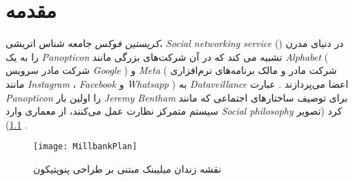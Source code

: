 
\chapter{مقدمه}
\ifDataveillance
  \textit{کریستین فوکس}
  جامعه شناس اتریشی،
  \textit{
    \gls{Social networking service}
  }
  \!({})
  در دنیای مدرن را به یک
  \textit{
    \gls{Panopticon}
  }
  تشبیه می کند   که در آن شرکت‌های بزرگی مانند
  \textit{
    \gls{Alphabet}
  }
  \!(
  شرکت مادر سرویس
  \textit{
    \gls{Google}
  }
  \!)
  و
  \textit{
    \gls{Meta}
  }
  \!(
  \!شرکت مادر و مالک برنامه‌های نرم‌افزاری مانند
  \textit{
    \gls{Instagram}
  }،
  \textit{
    \gls{Facebook}
  }
  و
  \textit{
    \gls{Whatsapp}
  }
  \!)
  به
  \textit{
    \gls{Dataveillance}
  }
  اعضا می‌پردازند
  \!\citep{romelePanopticismNotEnough2017a}.
  عبارت
  \textit{
    \gls{Panopticon}
  }
  را اولین بار
  \textit{
    \gls{Jeremy Bentham}
  }
  \!
  \citep{benthamPanopticonInspectionHouseContaining1791}
  برای توصیف ساختار‌های اجتماعی که مانند سیستم متمرکز نظارت عمل می‌کنند، از معماری وارد
  \textit{
    \gls{Social philosophy}
  }
  کرد
  \!(تصویر \ref{fig:MillbankPlan})
  \!\citep{holfordAccountGeneralPenitentiary1828}.
  \begin{figure}[ht]
    \centerline{\texttt{[image: MillbankPlan]}}
    \caption{نقشه زندان میلیبنک مبتنی بر طراحی پنوپتیکون
    }
    \label{fig:MillbankPlan}
  \end{figure}\\

